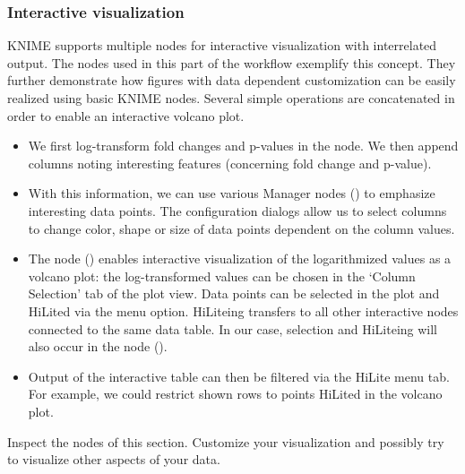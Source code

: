 \subsubsection{Interactive visualization}

KNIME supports multiple nodes for interactive visualization with interrelated output. The nodes used in this part of the workflow exemplify this concept. They further demonstrate how 
figures with data dependent customization can be easily realized using basic KNIME nodes. Several simple operations are concatenated in order to enable an interactive volcano plot.
\begin{itemize}
\item We first log-transform fold changes and p-values in the  node. We then append columns noting interesting features (concerning fold change and p-value).
\item With this information, we can use various Manager nodes () to emphasize interesting data points. The configuration dialogs allow us to select columns to change color, shape or size of data points dependent on the column values.
\item The  node () enables interactive visualization of the logarithmized values as a volcano plot: the log-transformed values can be chosen in the `Column Selection' tab of the plot view. Data points can be selected in the plot and HiLited via the menu option. HiLiteing transfers to all other interactive nodes connected to the same data table. In our case, selection and HiLiteing will also occur in the  node ().
\item Output of the interactive table can then be filtered via the HiLite menu tab. For example, we could restrict shown rows to points HiLited in the volcano plot.
\end{itemize}
\begin{task}
Inspect the nodes of this section. Customize your visualization and possibly try to visualize other aspects of your data.
\end{task}

